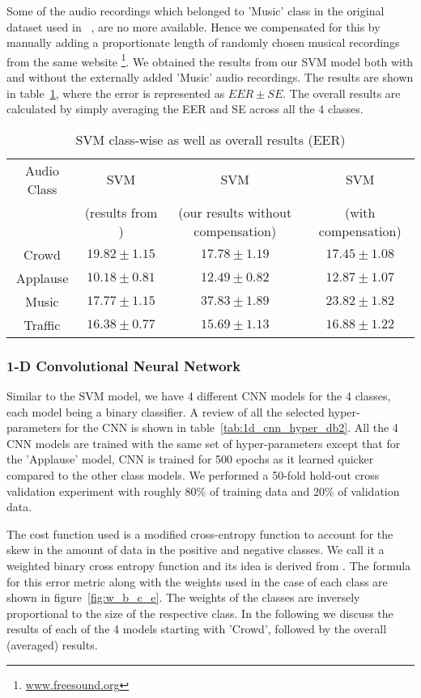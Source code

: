 Some of the audio recordings which belonged to 'Music' class in the original dataset used in ~\cite{kons2013audio}, are no more available. Hence we compensated for this by manually adding a proportionate length of randomly chosen musical recordings from the same website \footnote{\url{www.freesound.org}}. We obtained the results from our SVM model both with and without the externally added 'Music' audio recordings. The results are shown in table~\ref{tab:svm_db2}, where the error is represented as $EER \pm SE$. The overall results are calculated by simply averaging the EER and SE across all the 4 classes.

\begin{table}[tb]
\caption[SVM Results DB2]{SVM class-wise as well as overall results (EER)}
\label{tab:svm_db2}
\centering
\begin{tabular}{cccc}
\toprule
Audio Class & SVM  & SVM & SVM  \\
& (results from \cite{kons2013audio}) & (our results without compensation) & (with compensation) \\
\midrule
Crowd	& $19.82 \pm 1.15$ & $17.78 \pm 1.19$ & $17.45 \pm 1.08$ \\
Applause	& $10.18 \pm 0.81$ & $12.49 \pm 0.82$ & $12.87 \pm 1.07$ \\
Music	& $17.77 \pm 1.15$ & $37.83 \pm 1.89$ & $23.82 \pm 1.82$  \\
Traffic	& $16.38 \pm 0.77$ & $15.69 \pm 1.13$ & $16.88 \pm 1.22$  \\
\bottomrule 
\end{tabular}
\end{table}

\subsubsection{1-D Convolutional Neural Network}
Similar to the SVM model, we have 4 different CNN models for the 4 classes, each model being a binary classifier. A review of all the selected hyper-parameters for the CNN is shown in table~\ref{tab:1d_cnn_hyper_db2}. All the 4 CNN models are trained with the same set of hyper-parameters except that for the 'Applause' model, CNN is trained for 500 epochs as it learned quicker compared to the other class models. We performed a 50-fold hold-out cross validation experiment with roughly 80\% of training data and 20\% of validation data.

The cost function used is a modified cross-entropy function to account for the skew in the amount of data in the positive and negative classes. We call it a weighted binary cross entropy function and its idea is derived from \cite{kons2013audio}. The formula for this error metric along with the weights used in the case of each class are shown in figure~\ref{fig:w_b_c_e}. The weights of the classes are inversely proportional to the size of the respective class. In the following we discuss the results of each of the 4 models starting with 'Crowd', followed by the overall (averaged) results.

